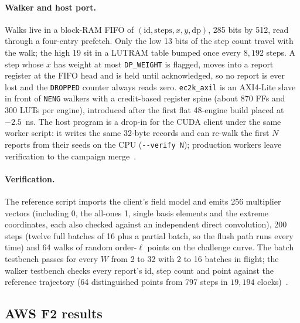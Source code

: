 \paragraph{Walker and host port.} Walks live in a block-RAM FIFO of
$(\mathrm{id},\mathrm{steps},x,y,\mathrm{dp})$, 285 bits by 512, read
through a four-entry prefetch. Only the low 13 bits of the step count
travel with the walk; the high 19 sit in a LUTRAM table bumped once
every $8{,}192$ steps. A step whose $x$ has weight at most
\texttt{DP\_WEIGHT} is flagged, moves into a report register at the
FIFO head and is held until acknowledged, so no report is ever lost
and the \texttt{DROPPED} counter always reads zero. \texttt{ec2k\_axil}
is an AXI4-Lite slave in front of \texttt{NENG} walkers with a
credit-based register spine (about 870 FFs and 300 LUTs per engine),
introduced after the first flat 48-engine build placed at
$-2.5$~ns. The host program is a drop-in for the CUDA client under
the same worker script: it writes the same 32-byte records and can re-walk the first $N$
reports from their seeds on the CPU (\texttt{-{}-verify N}); production
workers leave verification to the campaign
merge~.

\paragraph{Verification.} The reference script imports the client's
field model and emits 256 multiplier vectors (including 0, the
all-ones 1, single basis elements and the extreme coordinates, each
also checked against an independent direct convolution), 200 steps
(twelve full batches of 16 plus a partial batch, so the flush path
runs every time) and 64 walks of random order-$\ell$ points on the
challenge curve. The batch testbench passes for every $W$ from 2 to
32 with 2 to 16 batches in flight; the walker testbench checks every
report's id, step count and point against the reference trajectory
(64 distinguished points from 797 steps in $19{,}194$
clocks)~.

\subsection{AWS F2 results}
\label{sec:fpga-measured}

